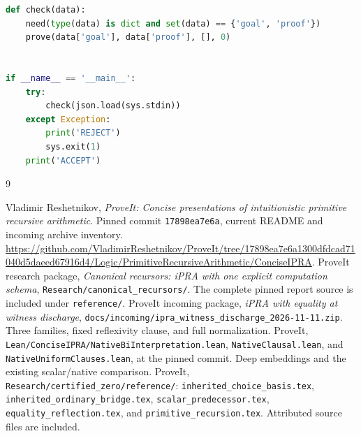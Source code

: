 \documentclass[11pt]{article}
\theoremstyle{definition}\newtheorem{definition}[theorem]{Definition}
\begin{document}
\begin{lstlisting}[language=Python]
def check(data):
    need(type(data) is dict and set(data) == {'goal', 'proof'})
    prove(data['goal'], data['proof'], [], 0)


if __name__ == '__main__':
    try:
        check(json.load(sys.stdin))
    except Exception:
        print('REJECT')
        sys.exit(1)
    print('ACCEPT')
\end{lstlisting}

\begin{thebibliography}{9}
\raggedright
{} Vladimir Reshetnikov, \emph{ProveIt: Concise presentations
of intuitionistic primitive recursive arithmetic}. Pinned commit
\texttt{17898ea7e6a}, current README and incoming archive inventory.
\url{https://github.com/VladimirReshetnikov/ProveIt/tree/17898ea7e6a1300dfdcad71040d5daeed67916d4/Logic/PrimitiveRecursiveArithmetic/ConciseIPRA}.
 ProveIt research package, \emph{Canonical recursors:
iPRA with one explicit computation schema}, \texttt{Research/canonical\_recursors/}.
The complete pinned report source is included under \texttt{reference/}.
 ProveIt incoming package, \emph{iPRA with equality at witness
discharge}, \texttt{docs/incoming/ipra\_witness\_discharge\_2026-11-11.zip}.
Three families, fixed reflexivity clause, and full normalization.
 ProveIt, \texttt{Lean/ConciseIPRA/NativeBiInterpretation.lean},
\texttt{NativeClausal.lean}, and \texttt{NativeUniformClauses.lean}, at the
pinned commit. Deep embeddings and the existing scalar/native comparison.
 ProveIt, \texttt{Research/certified\_zero/reference/}:
\texttt{inherited\_choice\_basis.tex}, \texttt{inherited\_ordinary\_bridge.tex},
\texttt{scalar\_predecessor.tex}, \texttt{equality\_reflection.tex}, and
\texttt{primitive\_recursion.tex}. Attributed source files are included.
\end{thebibliography}
\end{document}
